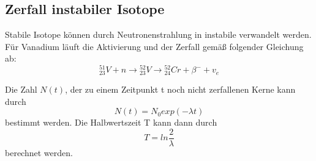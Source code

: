 \subsection{Zerfall instabiler Isotope}
\label{sec:zerfall}
Stabile Isotope können durch Neutronenstrahlung in instabile verwandelt werden. Für Vanadium läuft die Aktivierung und der Zerfall gemäß folgender Gleichung ab:
\begin{equation}
    \label{eqn:v}
    {^{51}_{23}V} + n \rightarrow {^{52}_{23}V} \rightarrow {^{52}_{24}Cr} + \beta^- +v_e
\end{equation}

Die Zahl $N(t)$, der zu einem Zeitpunkt t noch nicht zerfallenen Kerne kann durch
\begin{equation}
    N(t) = N_0 exp(− \lambda t)
\end{equation}
bestimmt werden.
Die Halbwertszeit T kann dann durch
\begin{equation}
T = ln \frac{2}{\lambda}
\end{equation}
berechnet werden.

